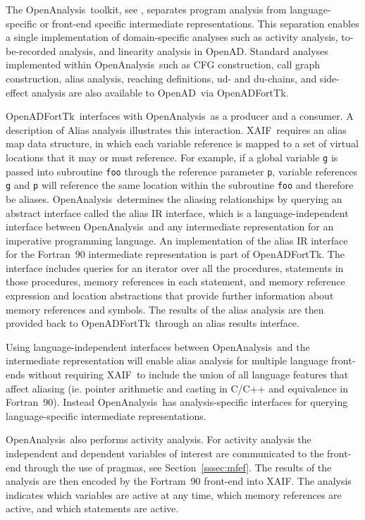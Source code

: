 \documentclass[acmtocl,acmnow]{acmtrans2m}
\newcommand{\OpenAD}{OpenAD}
\newcommand{\OpenADFortTk}{OpenADFortTk}
\newcommand{\OpenAnalysis}{OpenAnalysis}
\newcommand{\xaif}{XAIF}
\newcommand{\refsec}[1]{Section~\ref{#1}}
\begin{document}
The \OpenAnalysis\ toolkit, see \cite{oaWeb}, separates program
analysis from language-specific or front-end specific intermediate
representations.  This separation enables a single implementation of
domain-specific analyses such as activity analysis, to-be-recorded
analysis, and linearity analysis in \OpenAD.  Standard analyses
implemented within \OpenAnalysis\ such as CFG construction, call graph
construction, alias analysis, reaching definitions, ud- and du-chains,
and side-effect analysis are also available to \OpenAD\ via
\OpenADFortTk.

\OpenADFortTk\ interfaces with \OpenAnalysis\ as a producer and a
consumer.  A description of Alias analysis illustrates this
interaction.  \xaif\ requires an alias map data structure, in which
each variable reference is mapped to a set of virtual locations that
it may or must reference.  For example, if a global variable {\tt g}
is passed into subroutine {\tt foo} through the reference parameter
{\tt p}, variable references {\tt g} and {\tt p} will reference the
same location within the subroutine {\tt foo} and therefore be aliases.  
\OpenAnalysis\ determines the aliasing relationships by querying an
abstract interface called the alias IR interface, which is a 
language-independent interface between \OpenAnalysis\ and any
intermediate representation for an imperative programming language.  
An implementation of the alias IR interface for the Fortran~90
intermediate representation is part of
\OpenADFortTk.  The interface includes queries for an iterator over
all the procedures, statements in those procedures, memory references
in each statement, and memory reference expression and location
abstractions that provide further information about memory references
and symbols.  The results of the alias analysis are then provided back
to \OpenADFortTk\ through an alias results interface.

Using language-independent interfaces between \OpenAnalysis\ and the
intermediate representation will enable alias analysis for multiple
language front-ends without requiring \xaif\ to include the union of
all language features that affect aliasing (ie. pointer arithmetic and
casting in C/C++ and equivalence in Fortran~90).  Instead
\OpenAnalysis\ has analysis-specific interfaces for querying
language-specific intermediate representations.

\OpenAnalysis\ also performs activity analysis.  For activity analysis
the independent and dependent variables of interest are communicated
to the front-end through the use of pragmas, see \refsec{sssec:mfef}.
The results of the analysis are then encoded by the Fortram~90
front-end into \xaif.  The analysis indicates which variables are
active at any time, which memory references are active, and which
statements are active.
\end{document}

